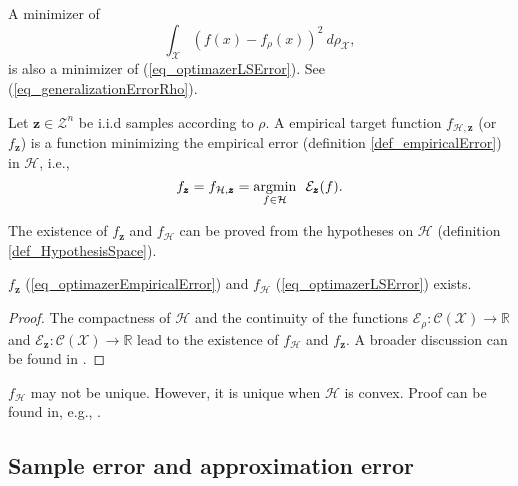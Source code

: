 \begin{remark}
A minimizer of
\begin{equation*}
     \int_{\mathcal{X}} (f(x) - f_{\rho}(x))^2 \ d\rho_{\mathcal{X}},
\end{equation*}
is also a minimizer of (\ref{eq_optimazerLSError}). See (\ref{eq_generalizationErrorRho}).
\end{remark}

\begin{definition}
  Let $\pmb{z} \in \mathcal{Z}^n$ be i.i.d samples according to $\rho$. A empirical target function $f_{\mathcal{H},\pmb{z}}$ (or $f_{\pmb{z}}$) is a function minimizing the empirical error (definition \ref{def_empiricalError}) in $\mathcal{H}$, i.e.,
  \begin{equation} \label{eq_optimazerEmpiricalError}
    f_{\pmb{z}} = f_{\mathcal{H},\pmb{z}} = \underset{f \in \mathcal{H}}{\textup{argmin}} \ \ \mathcal{E}_{\pmb{z}}(f).
  \end{equation}
\end{definition}

The existence of $f_{\pmb{z}}$ and $f_{\mathcal{H}}$ can be proved from the hypotheses on $\mathcal{H}$ (definition \ref{def_HypothesisSpace}). 

\begin{proposition} \label{prop_targetFunctionsExists}
  $f_{\pmb{z}}$ (\ref{eq_optimazerEmpiricalError}) and $f_{\mathcal{H}}$ (\ref{eq_optimazerLSError}) exists.
  \begin{proof}
  The compactness of $\mathcal{H}$ and the continuity of the functions $\mathcal{E}_{\rho}: \mathcal{C}(\mathcal{X}) \to \mathbb{R}$ and $\mathcal{E}_{\pmb{z}}: \mathcal{C}(\mathcal{X}) \to \mathbb{R}$ lead to the existence of $f_{\mathcal{H}}$ and $f_{\pmb{z}}$. A broader discussion can be found in \textcite{cucker2007}.
  \end{proof}
\end{proposition}

\begin{remark}
  $f_{\mathcal{H}}$ may not be unique. However, it is unique when $\mathcal{H}$ is convex. Proof can be found in, e.g., \textcite{cucker2001}.
\end{remark}

\subsection{Sample error and approximation error} \label{sec_sampleApproximationErrors}


